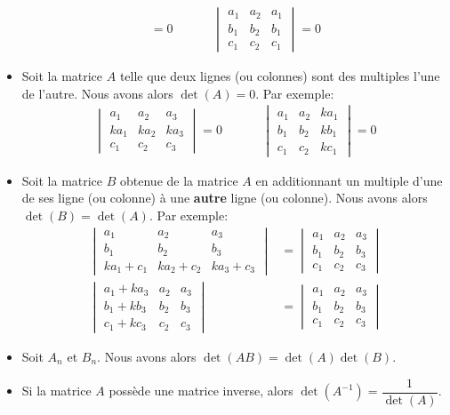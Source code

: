 \documentclass[]{book}
\theoremstyle{definition}
\theoremstyle{definition}
\theoremstyle{definition}
\theoremstyle{remark}
\begin{document}
\begin{itemize}
\begin{align*}
  =
  0
  &
  \phantom{aaa}
  &
  \begin{vmatrix}
  a_1 & a_2 & a_1 \\
  b_1 & b_2 & b_1 \\
  c_1 & c_2 & c_1
  \end{vmatrix}
  =0
  \end{align*}
\item
  Soit la matrice \(A\) telle que deux lignes (ou colonnes) sont des multiples l'une de l'autre. Nous avons alors \(\det(A)=0\). Par exemple:
  \begin{align*}
  \begin{vmatrix}
  a_1 & a_2 & a_3 \\
  ka_1 & ka_2 & ka_3 \\
  c_1 & c_2 & c_3
  \end{vmatrix}
  =
  0
  &
  \phantom{aaa}
  &
  \begin{vmatrix}
  a_1 & a_2 & ka_1 \\
  b_1 & b_2 & kb_1 \\
  c_1 & c_2 & kc_1
  \end{vmatrix}
  =0
  \end{align*}
\item
  Soit la matrice \(B\) obtenue de la matrice \(A\) en additionnant un multiple d'une de ses ligne (ou colonne) à une \textbf{autre} ligne (ou colonne). Nous avons alors \(\det(B)=\det(A)\). Par exemple:
  \begin{align*}
  \begin{vmatrix}
  a_1 & a_2 & a_3 \\
  b_1 & b_2 & b_3 \\
  ka_1+c_1 & ka_2+c_2 & ka_3+c_3
  \end{vmatrix}
  &=
  \begin{vmatrix}
  a_1 & a_2 & a_3 \\
  b_1 & b_2 & b_3 \\
  c_1 & c_2 & c_3
  \end{vmatrix}
  \\
  \begin{vmatrix}
  a_1+ka_3 & a_2 & a_3 \\
  b_1+kb_3 & b_2 & b_3 \\
  c_1+kc_3 & c_2 & c_3
  \end{vmatrix}
  &=
  \begin{vmatrix}
  a_1 & a_2 & a_3 \\
  b_1 & b_2 & b_3 \\
  c_1 & c_2 & c_3
  \end{vmatrix}
  \end{align*}
\item
  Soit \(A_n\) et \(B_n\). Nous avons alors \(\det(AB)=\det(A)\det(B)\).
\item
  Si la matrice \(A\) possède une matrice inverse, alors \(\det(A^{-1})=\dfrac{1}{\det(A)}\).

\end{itemize}
\end{document}
